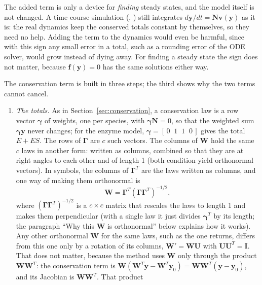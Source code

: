 \documentclass[11pt,a4paper,openany]{report}
\begin{document}
{{The added term is only a device for \emph{finding} steady states, and the
model itself is not changed. A time-course simulation
(, ) still integrates
$d\mathbf{y}/dt = \mathbf{N} \mathbf{v}(\mathbf{y})$ as it is: the real
dynamics keep the conserved totals constant by themselves, so they need no
help. Adding the term to the dynamics would even be harmful, since with
this sign any small error in a total, such as a rounding error of the ODE
solver, would grow instead of dying away. For finding a steady state the
sign does not matter, because $\mathbf{f}(\mathbf{y}) = 0$ has the same
solutions either way.

The conservation term is built in three steps; the third shows why the two
terms cannot cancel.

\begin{enumerate}
\item \emph{The totals.} As in Section~\ref{sec:conservation}, a conservation
  law is a row vector $\boldsymbol{\gamma}$ of weights, one per species, with $\boldsymbol{\gamma}
  \mathbf{N} = 0$, so that the weighted sum $\boldsymbol{\gamma} \mathbf{y}$ never changes; for
  the enzyme model, $\boldsymbol{\gamma} = [\,0 \;\; 1 \;\; 1 \;\; 0\,]$
  gives the total $E + ES$. The rows of $\mathbf{\Gamma}$ are $c$ such vectors. The columns of
  $\mathbf{W}$ hold the same $c$ laws in another form: written as
  columns, combined so that they are at right angles to each other and of
  length 1 (both condition yield orthonormal vectors). In symbols, the columns of $\mathbf{\Gamma}^T$ are the laws
  written as columns, and one way of making them orthonormal is
  \[
    \mathbf{W} = \mathbf{\Gamma}^T (\mathbf{\Gamma}\mathbf{\Gamma}^T)^{-1/2} ,
  \]
  where $(\mathbf{\Gamma}\mathbf{\Gamma}^T)^{-1/2}$ is a $c \times c$
  matrix that rescales the laws to length 1 and makes them perpendicular
  (with a single law it just divides $\boldsymbol{\gamma}^T$ by its
  length; the paragraph ``Why this $\mathbf{W}$ is orthonormal'' below
  explains how it works). Any other orthonormal $\mathbf{W}$ for the same laws,
  such as the one  returns, differs from this one only
  by a rotation of its columns, $\mathbf{W}' = \mathbf{W} \mathbf{U}$ with
  $\mathbf{U} \mathbf{U}^T = \mathbf{I}$. That does not matter, because the
  method uses $\mathbf{W}$ only through the product $\mathbf{W}
  \mathbf{W}^T$: the conservation term is $\mathbf{W}(\mathbf{W}^T \mathbf{y}
  - \mathbf{W}^T \mathbf{y}_0) = \mathbf{W} \mathbf{W}^T (\mathbf{y} -
  \mathbf{y}_0)$, and its Jacobian is $\mathbf{W} \mathbf{W}^T$. That product

\end{enumerate}}}
\end{document}
